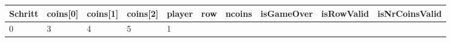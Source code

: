 \documentclass[]{article}
\begin{document}
\begin{longtable}[c]{@{}llllllllll@{}}
\toprule
\begin{minipage}[b]{0.04\columnwidth}\raggedright\strut
Schritt
\strut\end{minipage} &
\begin{minipage}[b]{0.04\columnwidth}\raggedright\strut
coins{[}0{]}
\strut\end{minipage} &
\begin{minipage}[b]{0.04\columnwidth}\raggedright\strut
coins{[}1{]}
\strut\end{minipage} &
\begin{minipage}[b]{0.04\columnwidth}\raggedright\strut
coins{[}2{]}
\strut\end{minipage} &
\begin{minipage}[b]{0.04\columnwidth}\raggedright\strut
player
\strut\end{minipage} &
\begin{minipage}[b]{0.04\columnwidth}\raggedright\strut
row
\strut\end{minipage} &
\begin{minipage}[b]{0.04\columnwidth}\raggedright\strut
ncoins
\strut\end{minipage} &
\begin{minipage}[b]{0.04\columnwidth}\raggedright\strut
isGameOver
\strut\end{minipage} &
\begin{minipage}[b]{0.04\columnwidth}\raggedright\strut
isRowValid
\strut\end{minipage} &
\begin{minipage}[b]{0.04\columnwidth}\raggedright\strut
isNrCoinsValid
\strut\end{minipage}\tabularnewline
\midrule
\endhead
\begin{minipage}[t]{0.04\columnwidth}\raggedright\strut
0
\strut\end{minipage} &
\begin{minipage}[t]{0.04\columnwidth}\raggedright\strut
3
\strut\end{minipage} &
\begin{minipage}[t]{0.04\columnwidth}\raggedright\strut
4
\strut\end{minipage} &
\begin{minipage}[t]{0.04\columnwidth}\raggedright\strut
5
\strut\end{minipage} &
\begin{minipage}[t]{0.04\columnwidth}\raggedright\strut
1
\strut\end{minipage} &

\end{longtable}
\end{document}
